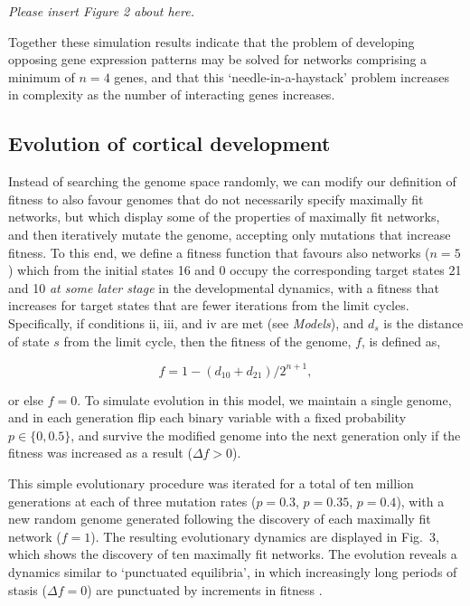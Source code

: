 \documentclass[10pt,letterpaper]{article}
\begin{document}
\vspace{1em}\emph{\noindent Please insert Figure 2 about here.}\vspace{1em}

Together these simulation results indicate that the problem of developing opposing gene expression patterns may be solved for networks comprising a minimum of $n=4$ genes, and that this `needle-in-a-haystack' problem increases in complexity as the number of interacting genes increases.

\subsection*{Evolution of cortical development}

Instead of searching the genome space randomly, we can modify our definition of fitness to also favour genomes that do not necessarily specify maximally fit networks, but which display some of the properties of maximally fit networks, and then iteratively mutate the genome, accepting only mutations that increase fitness. To this end, we define a fitness function that favours also networks ($n=5$) which from the initial states 16 and 0 occupy the corresponding target states 21 and 10 \emph{at some later stage} in the developmental dynamics, with a fitness that increases for target states that are fewer iterations from the limit cycles. Specifically, if conditions ii, iii, and iv are met (see \emph{Models}), and $d_s$ is the distance of state $s$ from the limit cycle, then the fitness of the genome, $f$, is defined as,

\begin{equation}
f=1-\left(d_{10}+d_{21}\right)/2^{n+1},
\end{equation}

\noindent or else $f=0$. To simulate evolution in this model, we maintain a single genome, and in each generation flip each binary variable with a fixed probability $p\in\{0,0.5\}$, and survive the modified genome into the next generation only if the fitness was increased as a result ($\Delta f>0$).

This simple evolutionary procedure was iterated for a total of ten million generations at each of three mutation rates ($p=0.3$, $p=0.35$, $p=0.4$), with a new random genome generated following the discovery of each maximally fit network ($f=1$). The resulting evolutionary dynamics are displayed in Fig.~3, which shows the discovery of ten maximally fit networks. The evolution reveals a dynamics similar to `punctuated equilibria', in which increasingly long periods of stasis ($\Delta f=0$) are punctuated by increments in fitness \cite{Gould1977,Bak1996}.
\end{document}
